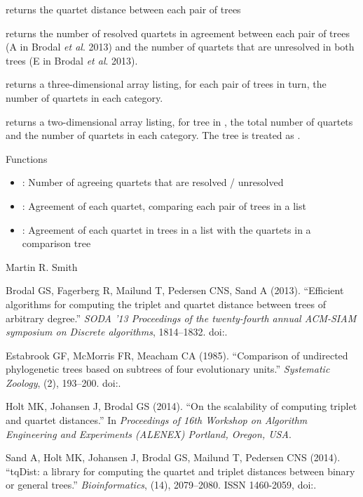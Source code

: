 \documentclass[a4paper]{book}
\begin{document}
%
\begin{Value}
 returns the quartet distance between each pair of trees

 returns the number of resolved quartets in agreement between
each pair of trees (A in Brodal \emph{et al}. 2013) and the number of quartets
that are unresolved in both trees (E in Brodal \emph{et al}. 2013).

 returns a three-dimensional array listing,
for each pair of trees in turn, the number of quartets in each category.

 returns a two-dimensional array listing,
for tree in , the total number of quartets and the
number of quartets in each category.
The  tree is treated as .
\end{Value}
%
\begin{Section}{Functions}
\begin{itemize}

\item {}: Number of agreeing quartets that are resolved / unresolved

\item {}: Agreement of each quartet, comparing each pair of trees in a list

\item {}: Agreement of each quartet in trees in a list with the
quartets in a comparison tree

\end{itemize}
\end{Section}
%
\begin{Author}\relax
Martin R. Smith
\end{Author}
%
\begin{References}\relax
Brodal GS, Fagerberg R, Mailund T, Pedersen CNS, Sand A (2013).
``Efficient algorithms for computing the triplet and quartet distance between trees of arbitrary degree.''
\emph{SODA '13 Proceedings of the twenty-fourth annual ACM-SIAM symposium on Discrete algorithms}, 1814--1832.
doi:\nobreakspace{}.

Estabrook GF, McMorris FR, Meacham CA (1985).
``Comparison of undirected phylogenetic trees based on subtrees of four evolutionary units.''
\emph{Systematic Zoology}, (2), 193--200.
doi:\nobreakspace{}.

Holt MK, Johansen J, Brodal GS (2014).
``On the scalability of computing triplet and quartet distances.''
In \emph{Proceedings of 16th Workshop on Algorithm Engineering and Experiments (ALENEX) Portland, Oregon, USA}.

Sand A, Holt MK, Johansen J, Brodal GS, Mailund T, Pedersen CNS (2014).
``tqDist: a library for computing the quartet and triplet distances between binary or general trees.''
\emph{Bioinformatics}, (14), 2079--2080.
ISSN 1460-2059, doi:\nobreakspace{}.
\end{References}
\printindex{}
\end{document}
